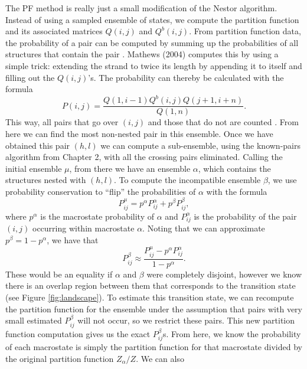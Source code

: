 The PF method is really just a small modification of the Nestor
algorithm. Instead of using a sampled ensemble of states, we compute
the partition function and its associated matrices $Q(i, j)$ and
$Q^b(i,j)$. From partition function data, the probability of a pair
can be computed by summing up the probabilities of all structures that
contain the pair \cite{mccaskill1990equilibrium}. Mathews (2004)
computes this by using a simple trick: extending the strand to twice
its length by appending it to itself and filling out the
$Q(i,j)$'s. The probability can thereby be calculated with the formula
\begin{equation}
P(i,j) = \frac{Q(1, i-1) Q^b(i,j) Q(j+1, i + n)}{Q(1, n)}.
\end{equation}
This way, all pairs that go over $(i,j)$ and those that do not are
counted \cite{mathews2004using}. From here we can find the most
non-nested pair in this ensemble. Once we have obtained this pair
$(h,l)$ we can compute a sub-ensemble, using the known-pairs algorithm
from Chapter 2, with all the crossing pairs eliminated. Calling the
initial ensemble $\mu$, from there we have an ensemble $\alpha$, which
contains the structures nested with $(h,l)$. To compute the
incompatible ensemble $\beta$, we use probability conservation
to ``flip'' the probabilities of $\alpha$ with the formula
\begin{equation}
P^\mu_{ij} = p^\alpha P^\alpha_{ij} + p^\beta P^\beta_{ij},
\end{equation}
where $p^\alpha$ is the macrostate probability of $\alpha$ and $P^\alpha_{ij}$
is the probability of the pair $(i,j)$ occurring within macrostate
$\alpha$. Noting that we can approximate $p^\beta = 1 - p^\alpha$, we have
that
\begin{equation}
P^\beta_{ij} \approx \frac{P^\mu_{ij} - p^\alpha P^\alpha_{ij}}{1 - p^\alpha}.
\end{equation}
These would be an equality if $\alpha$ and $\beta$ were completely
disjoint, however we know there is an overlap region between them that
corresponds to the transition state (see Figure
\ref{fig:landscape}). To estimate this transition state, we can
recompute the partition function for the ensemble under the assumption
that pairs with very small estimated $P^\beta_{ij}$ will not occur, so
we restrict these pairs. This new partition function computation gives
us the exact $P^\beta_{ij}$s. From here, we know the probability of
each macrostate is simply the partition function for that macrostate
divided by the original partition function $Z_\alpha/Z$. We can also
